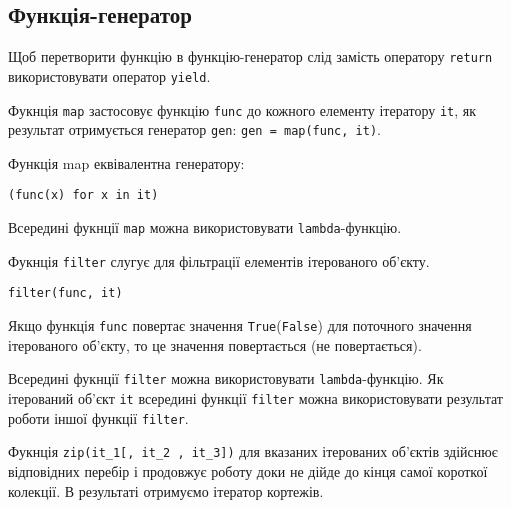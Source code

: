 \subsection{Функція-генератор} 
\begin{frame}
Щоб перетворити функцію в функцію-генератор слід замість оператору \texttt{return} використовувати оператор \texttt{yield}.
\end{frame}

\begin{frame}
Фукнція \texttt{map} застосовує функцію \texttt{func} до кожного елементу ітератору \texttt{it}, як результат отримується генератор \texttt{gen}: \texttt{gen = map(func, it)}. 

Функція map еквівалентна генератору:

\texttt{(func(x) for x in it)}

Всередині фукнції \texttt{map} можна використовувати \texttt{lambda}-функцію. 
\end{frame}

\begin{frame}
Фукнція \texttt{filter} слугує для фільтрації елементів ітерованого об'єкту.

\texttt{filter(func, it)}

Якщо функція \texttt{func} повертає значення \texttt{True}(\texttt{False}) для поточного значення ітерованого об'єкту, то це значення повертається (не повертається).

Всередині фукнції \texttt{filter} можна використовувати \texttt{lambda}-функцію. Як ітерований об'єкт \texttt{it} всередині функції \texttt{filter}  можна використовувати результат роботи іншої функції \texttt{filter}.
\end{frame}

\begin{frame}
Фукнція \texttt{zip(it\_1[, it\_2 , it\_3])} для вказаних ітерованих об'єктів здійснює відповідних перебір і продовжує роботу доки не дійде до кінця самої короткої колекції. В результаті отримуємо ітератор кортежів.

\end{frame}

